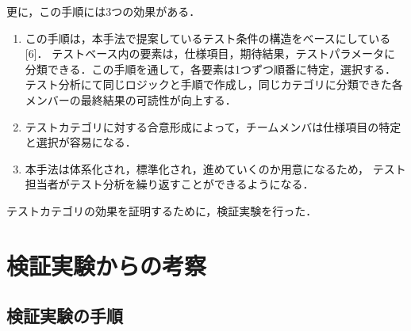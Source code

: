 \documentclass[a4paper,12pt]{jreport}
\begin{document}
更に，この手順には3つの効果がある．
\begin{enumerate}
\item この手順は，本手法で提案しているテスト条件の構造をベースにしている [6]． テストベース内の要素は，仕様項目，期待結果，テストパラメータに分類できる．この手順を通して，各要素は1つずつ順番に特定，選択する． テスト分析にて同じロジックと手順で作成し，同じカテゴリに分類できた各メンバーの最終結果の可読性が向上する．
\item テストカテゴリに対する合意形成によって，チームメンバは仕様項目の特定と選択が容易になる．
\item 本手法は体系化され，標準化され，進めていくのか用意になるため， テスト担当者がテスト分析を繰り返すことができるようになる．
\end{enumerate}

テストカテゴリの効果を証明するために，検証実験を行った．

\section{検証実験からの考察}
\subsection{検証実験の手順}
\end{document}
